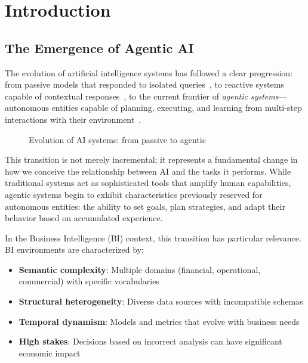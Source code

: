 \documentclass[11pt,a4paper]{article}
\theoremstyle{definition}
\theoremstyle{remark}
\begin{document}

\section{Introduction}
\label{sec:introduction}

\subsection{The Emergence of Agentic AI}

The evolution of artificial intelligence systems has followed a clear progression: from passive models that responded to isolated queries~\cite{brown2020language}, to reactive systems capable of contextual responses~\cite{openai2023gpt4}, to the current frontier of \textit{agentic systems}---autonomous entities capable of planning, executing, and learning from multi-step interactions with their environment~\cite{wooldridge1995intelligent}.

\begin{figure}[H]
    \centering
    
    \caption{Evolution of AI systems: from passive to agentic}
    \label{fig:evolution-ai}
\end{figure}

This transition is not merely incremental; it represents a fundamental change in how we conceive the relationship between AI and the tasks it performs. While traditional systems act as sophisticated tools that amplify human capabilities, agentic systems begin to exhibit characteristics previously reserved for autonomous entities: the ability to set goals, plan strategies, and adapt their behavior based on accumulated experience.

In the Business Intelligence (BI) context, this transition has particular relevance. BI environments are characterized by:

\begin{itemize}
    \item \textbf{Semantic complexity}: Multiple domains (financial, operational, commercial) with specific vocabularies
    \item \textbf{Structural heterogeneity}: Diverse data sources with incompatible schemas
    \item \textbf{Temporal dynamism}: Models and metrics that evolve with business needs
    \item \textbf{High stakes}: Decisions based on incorrect analysis can have significant economic impact
\end{itemize}
\end{document}
